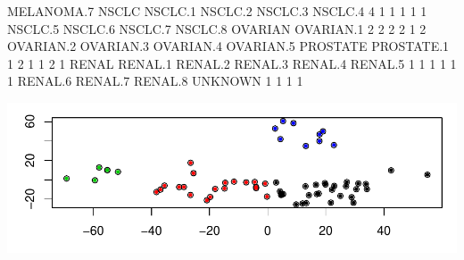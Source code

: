 \documentclass[12pt,a4paper]{paper}
\begin{document}
\begin{enumerate}
\begin{enumerate}
\begin{Schunk}
\begin{Soutput}
 MELANOMA.7       NSCLC     NSCLC.1     NSCLC.2     NSCLC.3     NSCLC.4 
          4           1           1           1           1           1 
    NSCLC.5     NSCLC.6     NSCLC.7     NSCLC.8     OVARIAN   OVARIAN.1 
          2           2           2           2           1           2 
  OVARIAN.2   OVARIAN.3   OVARIAN.4   OVARIAN.5    PROSTATE  PROSTATE.1 
          1           2           1           1           2           1 
      RENAL     RENAL.1     RENAL.2     RENAL.3     RENAL.4     RENAL.5 
          1           1           1           1           1           1 
    RENAL.6     RENAL.7     RENAL.8     UNKNOWN 
          1           1           1           1 
\end{Soutput}
\end{Schunk}
\includegraphics{HW4_DanielOsorio-014}
\end{enumerate}
\end{enumerate}
\end{document}
